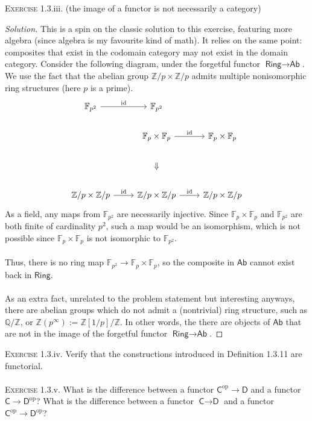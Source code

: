 \documentclass{article}
\newcommand{\Z}{\mathbb{Z}}
\newcommand{\Q}{\mathbb{Q}}
\newcommand{\cat}[1]{\textsf{#1}}
\newenvironment{solution}{\begin{proof}[Solution]}{\end{proof}}
\begin{document}
\noindent \textsc{Exercise} 1.3.iii. (the image of a functor is not necessarily a category)
\begin{solution}
    This is a spin on the classic solution to this exercise, featuring more algebra (since algebra is my favourite kind of math). It relies on the same point: composites that exist in the codomain category may not exist in the domain category. Consider the following diagram, under the forgetful functor $\cat{Ring} \to \cat{Ab}$. We use the fact that the abelian group $\Z/p \times \Z/p$ admits multiple nonisomorphic ring structures (here $p$ is a prime).
    \begin{equation}
    \begin{tikzcd}
        \mathbb{F}_{p^2} \arrow[r, "\text{id}"] &\mathbb{F}_{p^2} \\
        &\mathbb{F}_p \times \mathbb{F}_p \arrow[r, "\text{id}"] &\mathbb{F}_p \times \mathbb{F}_p \\
        &\Downarrow \\
        \Z / p \times \Z / p \arrow[r, "\text{id}"] &\Z / p \times \Z / p \arrow[r, "\text{id}"] &\Z/p \times \Z/p
    \end{tikzcd}
    \end{equation}As a field, any maps from $\mathbb{F}_{p^2}$ are necessarily injective. Since $\mathbb{F}_p \times \mathbb{F}_p$ and $\mathbb{F}_{p^2}$ are both finite of cardinality $p^2$, such a map would be an isomorphism, which is not possible since $\mathbb{F}_p \times \mathbb{F}_p$ is not isomorphic to $\mathbb{F}_{p^2}$. \\ \\
Thus, there is no ring map $\mathbb{F}_{p^2} \to \mathbb{F}_p \times \mathbb{F}_p$, so the composite in $\cat{Ab}$ cannot exist back in $\cat{Ring}$. \\ \\
    As an extra fact, unrelated to the problem statement but interesting anyways, there are abelian groups which do not admit a (nontrivial) ring structure, such as $\Q / \Z$, or $\Z(p^{\infty}) := \Z[1/p] / \Z $. In other words, the there are objects of $\cat{Ab}$ that are not in the image of the forgetful functor $\cat{Ring} \to \cat{Ab}$.
\end{solution}
\noindent \textsc{Exercise} 1.3.iv. Verify that the constructions introduced in Definition 1.3.11 are functorial. \\ \\
\textsc{Exercise} 1.3.v. What is the difference between a functor $\textsf{C}^{\text{op}} \to \textsf{D}$ and a functor $\textsf{C} \to \textsf{D}^{\text{op}}$? What is the difference between a functor $\textsf{C} \to \textsf{D}$ and a functor $\textsf{C}^{\text{op}} \to \textsf{D}^{\text{op}}$? \\ \\
\end{document}
